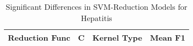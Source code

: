 \begin{table}[!htbp]
\centering
\caption{Significant Differences in SVM-Reduction Models for Hepatitis}
\label{tab:svm_reduction_significant_pairs_hepatitis}
\begin{tabular}{lrlr}
\toprule
Reduction Func & C & Kernel Type & Mean F1 \\
\midrule
\bottomrule
\end{tabular}
\end{table}
